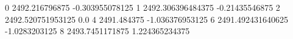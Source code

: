 0 2492.216796875 -0.303955078125
1 2492.306396484375 -0.21435546875
2 2492.520751953125 0.0
4 2491.484375 -1.036376953125
6 2491.492431640625 -1.0283203125
8 2493.7451171875 1.224365234375
